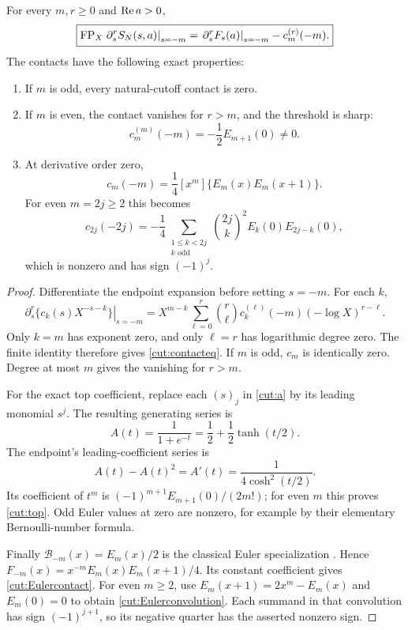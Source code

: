 \begin{theorem}\label{cut:contacts}
For every $m,r\ge0$ and $\operatorname{Re} a>0$,
\begin{equation}\label{cut:contacteq}
 \boxed{\displaystyle
 \operatorname{FP}_X\left.\partial_s^rS_N(s,a)\right|_{s=-m}
   =\left.\partial_s^rF_s(a)\right|_{s=-m}-c_m^{(r)}(-m).}
\end{equation}
The contacts have the following exact properties:
\begin{enumerate}
\item If $m$ is odd, every natural-cutoff contact is zero.
\item If $m$ is even, the contact vanishes for $r>m$, and the threshold
is sharp:
\begin{equation}\label{cut:top}
 c_m^{(m)}(-m)=-\frac12 E_{m+1}(0)\ne0.
\end{equation}
\item At derivative order zero,
\begin{equation}\label{cut:Eulercontact}
 c_m(-m)=\frac14[x^m]\{E_m(x)E_m(x+1)\}.
\end{equation}
For even $m=2j\ge2$ this becomes
\begin{equation}\label{cut:Eulerconvolution}
 c_{2j}(-2j)
 =-\frac14\sum_{\substack{1\le k<2j\\k\text{ odd}}}
     \binom{2j}{k}^{\!2}E_k(0)E_{2j-k}(0),
\end{equation}
which is nonzero and has sign $(-1)^j$.
\end{enumerate}
\end{theorem}
\begin{proof}
Differentiate the endpoint expansion before setting $s=-m$.
For each $k$,
\[
 \left.\partial_s^r\{c_k(s)X^{-s-k}\}\right|_{s=-m}
 =X^{m-k}\sum_{\ell=0}^{r}\binom r\ell
       c_k^{(\ell)}(-m)(-\log X)^{r-\ell}.
\]
Only $k=m$ has exponent zero, and only $\ell=r$ has logarithmic degree
zero. The finite identity therefore gives \eqref{cut:contacteq}.
If $m$ is odd, $c_m$ is identically zero. Degree at most $m$ gives the
vanishing for $r>m$.

For the exact top coefficient, replace each $(s)_j$ in \eqref{cut:a}
by its leading monomial $s^j$. The resulting generating series is
\[
 A(t)=\frac1{1+e^{-t}}=\frac12+\frac12\tanh(t/2).
\]
The endpoint's leading-coefficient series is
\[
 A(t)-A(t)^2=A'(t)=\frac1{4\cosh^2(t/2)}.
\]
Its coefficient of $t^m$ is
$(-1)^{m+1}E_{m+1}(0)/(2m!)$; for even $m$ this proves
\eqref{cut:top}. Odd Euler values at zero are nonzero, for example by
their elementary Bernoulli-number formula.

Finally $\mathcal B_{-m}(x)=E_m(x)/2$ is the classical Euler
specialization \cite{HuKimAsymptotic}. Hence
$F_{-m}(x)=x^{-m}E_m(x)E_m(x+1)/4$.
Its constant coefficient gives \eqref{cut:Eulercontact}. For even
$m\ge2$, use $E_m(x+1)=2x^m-E_m(x)$ and $E_m(0)=0$ to obtain
\eqref{cut:Eulerconvolution}. Each summand in that convolution has
sign $(-1)^{j+1}$, so its negative quarter has the asserted nonzero sign.
\end{proof}

